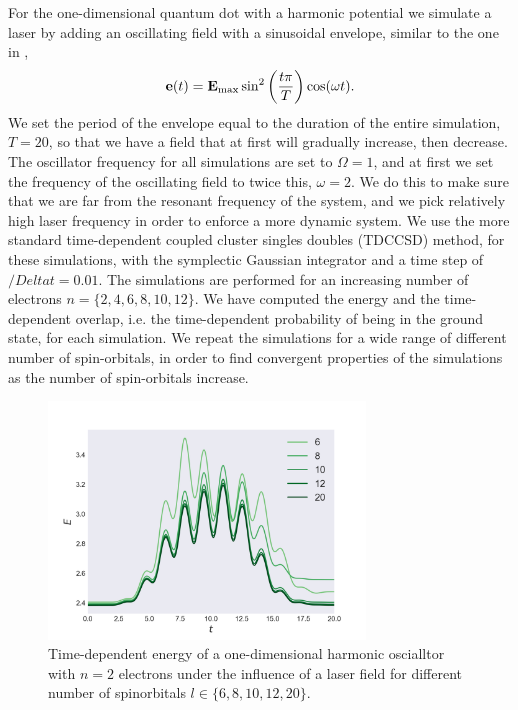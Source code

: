 For the one-dimensional quantum dot with a harmonic potential we simulate a laser by 
adding an oscillating 
field with a sinusoidal envelope, similar to the one in
\citeauthor{pedersen2019symplectic}\cite{pedersen2019symplectic},
\begin{equation}
    \label{eq:results_1d_field}
    \vb{e}(t) = \vb{E}_\text{max}\sin^2\left(\frac{t\pi}{T}\right)\cos(\omega t).
\end{equation}
We set the period of the envelope equal to the duration of the entire simulation,
$T=20$, so that we have a field that at first will gradually increase, then decrease.
The oscillator frequency for all simulations are set to $\Omega=1$, and at first we 
set the frequency of the oscillating field to twice this, $\omega = 2$. We do this 
to make sure that we are far from the resonant frequency of the system, and we pick 
relatively high laser frequency in order to enforce a more dynamic system. We use the 
more standard time-dependent coupled cluster singles doubles (TDCCSD) method, for 
these simulations, with the symplectic Gaussian integrator and a time step of
$/Deltat=0.01$.
The simulations are performed for an increasing number of electrons
$n = \{2,4,6,8,10,12\}$. We have computed the energy and the time-dependent overlap,
i.e. the time-dependent probability of being in the ground state, for each simulation.
We repeat the simulations for a wide range of different number of spin-orbitals,
in order to find convergent properties of the simulations as the number of spin-orbitals increase.

\begin{figure}[ht]
    \centering
    \includegraphics[width=0.75\textwidth]{results/figures/1D/n=2energy.png} 
    \caption{Time-dependent energy of a one-dimensional harmonic oscialltor 
        with $n=2$ electrons
        under the influence of a laser field for different number of spinorbitals
        $l\in\{6,8,10,12,20\}$.
    }
    \label{fig:1d_n2_E}
\end{figure}

